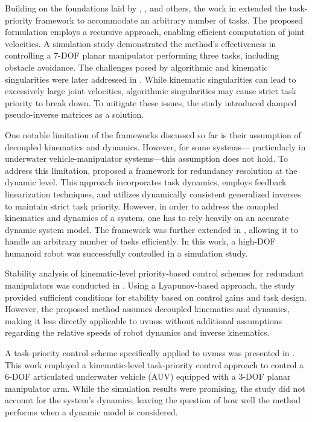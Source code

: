 Building on the foundations laid by \cite{hanafusa1981}, \cite{nakamura1987}, 
and others, the work in \cite{siciliano1991} extended the task-priority 
framework to accommodate an arbitrary number of tasks. The proposed formulation 
employs a recursive approach, enabling efficient computation of joint 
velocities. A simulation study demonstrated the method's effectiveness in 
controlling a 7-DOF planar manipulator performing three tasks, including 
obstacle avoidance. The challenges posed by algorithmic and kinematic 
singularities were later addressed in \cite{chiaverini1997}. While kinematic 
singularities can lead to excessively large joint velocities, algorithmic 
singularities may cause strict task priority to break down. To mitigate these 
issues, the study introduced damped pseudo-inverse matrices as a solution.

One notable limitation of the frameworks discussed so far is their assumption 
of decoupled kinematics and dynamics. However, for some systems—
particularly in underwater vehicle-manipulator systems—this 
assumption does not hold. To address this limitation, \cite{khatib1987} 
proposed a framework for redundancy resolution at the dynamic level. This 
approach incorporates task dynamics, employs feedback linearization techniques, 
and utilizes dynamically consistent generalized inverses \cite{khatib1995} to 
maintain strict task priority.
However, in order to address the couopled kinematics and dynamics of a system, one has to rely heavily on an accurate
dynamic system model.
The framework was further extended in \cite{khatib2004,sentis2004}, 
allowing it to handle an arbitrary number of tasks efficiently. In this work, a 
high-DOF humanoid robot was successfully controlled in a simulation study.

Stability analysis of kinematic-level priority-based control schemes for 
redundant manipulators was conducted in \cite{antonelli2009}. Using a 
Lyapunov-based approach, the study provided sufficient conditions for stability 
based on control gains and task design. However, the proposed method assumes 
decoupled kinematics and dynamics, making it less directly applicable to \gls{uvms}s 
without additional assumptions regarding the relative speeds of robot dynamics 
and inverse kinematics.

A task-priority control scheme specifically applied to \gls{uvms}s was presented in 
\cite{antonelli1998}. This work employed a kinematic-level task-priority 
control approach to control a 6-DOF articulated underwater vehicle (AUV) 
equipped with a 3-DOF planar manipulator arm. While the simulation results were 
promising, the study did not account for the system's dynamics, leaving the question
of how well the method performs when a dynamic model is considered.

